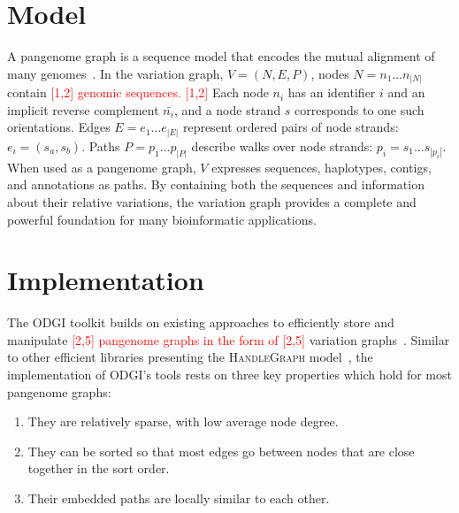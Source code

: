 \documentclass{bioinfo}
\newcommand{\REVIEWED}[1]{{\textcolor{Red}{#1}}}
\begin{document}
\section{Model}
A pangenome graph is a sequence model that encodes the mutual alignment of many genomes~\citep{Garrison_2019_thesis,Eizenga_2020}.
In the variation graph, $V = (N, E, P)$, nodes $N = n_1\ldots n_{|N|}$ contain \REVIEWED{[1,2] genomic sequences. [1,2]}
Each node $n_i$ has an identifier $i$ and an implicit reverse complement $\bar{n_i}$, and a node strand $s$ corresponds to one such orientations.
Edges $E = e_1\ldots e_{|E|}$ represent ordered pairs of node strands: $e_i = ( s_a, s_b )$.
Paths $P = p_1\ldots p_{|P|}$ describe walks over node strands: $p_i = s_1 \ldots s_{|p_i|}$.
When used as a pangenome graph, $V$ expresses sequences, haplotypes, contigs, and annotations as paths.
By containing both the sequences and information about their relative variations, the variation graph provides a complete and powerful foundation for many bioinformatic applications.


\section{Implementation}
The ODGI toolkit builds on existing approaches to efficiently store and manipulate \REVIEWED{[2,5] pangenome graphs in the form of [2,5]} variation graphs~\citep{Garrison:2018}.
Similar to other efficient libraries presenting the \textsc{HandleGraph} model~\citep{Eizenga_2020_BX}, the implementation of ODGI's tools rests on three key properties which hold for most pangenome graphs:

\begin{enumerate}
\item They are relatively sparse, with low average node degree.
\item They can be sorted so that most edges go between nodes that are close together in the sort order.
\item Their embedded paths are locally similar to each other.
\end{enumerate}
\end{document}
